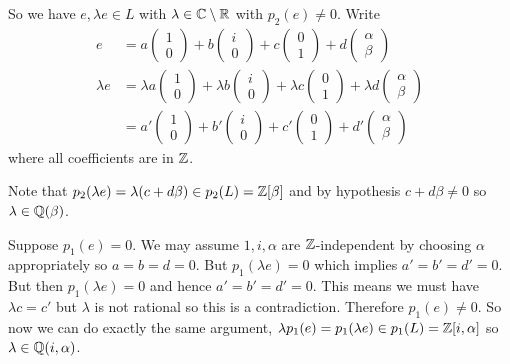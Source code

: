 \documentclass[11pt]{article}
\begin{document}
\begin{ex}
	So we have $e,\lambda e\in L$ with $\lambda\in\mathbb{C}\setminus\mathbb{R}$ with $p_2(e)\neq 0$. Write
	\begin{align*}
		e &= 
		a\begin{pmatrix}1 \\ 0\end{pmatrix}
		+b\begin{pmatrix}i \\ 0\end{pmatrix}
		+c\begin{pmatrix}0 \\ 1\end{pmatrix}
		+d\begin{pmatrix}\alpha \\ \beta\end{pmatrix}
		\\
		\lambda e &= 
		\lambda a\begin{pmatrix}1 \\ 0\end{pmatrix}
		+\lambda b\begin{pmatrix}i \\ 0\end{pmatrix}
		+\lambda c\begin{pmatrix}0 \\ 1\end{pmatrix}
		+\lambda d\begin{pmatrix}\alpha \\ \beta\end{pmatrix}
		\\
		&=
		a'\begin{pmatrix}1 \\ 0\end{pmatrix}
		+b'\begin{pmatrix}i \\ 0\end{pmatrix}
		+c'\begin{pmatrix}0 \\ 1\end{pmatrix}
		+d'\begin{pmatrix}\alpha \\ \beta\end{pmatrix}
	\end{align*}
	where all coefficients are in $\mathbb{Z}$.
	
	Note that $p_2(\lambda e) = \lambda(c + d\beta) \in p_2(L) = \mathbb{Z}[\beta]$ and by hypothesis $c+d\beta\neq 0$ so $\lambda \in \mathbb{Q}(\beta)$.
	
	Suppose $p_1(e) = 0$. We may assume $1,i,\alpha$ are $\mathbb{Z}$-independent by choosing $\alpha$ appropriately so $a=b=d=0$. But $p_1(\lambda e)=0$ which implies $a'=b'=d'=0$. But then $p_1(\lambda e) = 0$ and hence $a'=b'=d'=0$. This means we must have $\lambda c = c'$ but $\lambda$ is not rational so this is a contradiction. Therefore $p_1(e) \neq 0$. So now we can do exactly the same argument, $\lambda p_1(e) = p_1(\lambda e)\in p_1(L) = \mathbb{Z}[i,\alpha]$ so $\lambda \in \mathbb{Q}(i,\alpha)$.
	

\end{ex}
\end{document}
